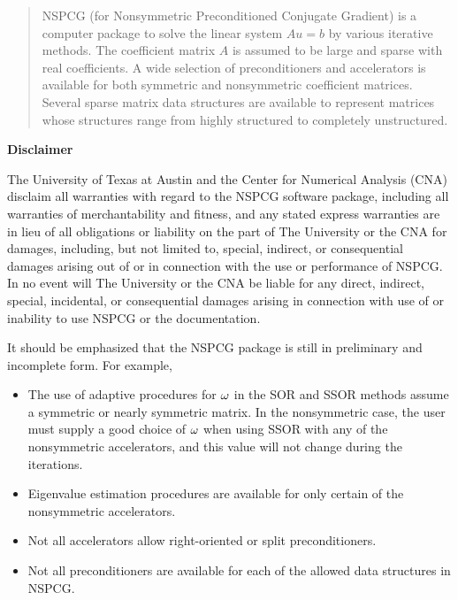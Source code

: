 \date{April, 1988}
\maketitle
\begin{abstract}

   NSPCG (for Nonsymmetric Preconditioned Conjugate Gradient) is
a computer package to solve the linear system $Au=b$ by various
iterative methods.  The coefficient matrix $A$ is assumed to be large and
sparse with real coefficients.  A wide selection of preconditioners 
and accelerators is available for both symmetric and nonsymmetric 
coefficient matrices.  Several sparse matrix data structures are
available to represent matrices whose structures range from highly
structured to completely unstructured.
\end{abstract}
\newpage
\centerline{\bf Disclaimer}
\bigskip

   The University of Texas at Austin and the Center for Numerical 
Analysis (CNA) disclaim all warranties with regard to the NSPCG 
software package, including all warranties of merchantability and 
fitness, and any stated express warranties are in lieu of all 
obligations or liability on the part of The University or the CNA 
for damages, including, but not limited to, special, indirect, or 
consequential damages arising out of or in connection with the 
use or performance of NSPCG.  In no event will The University or 
the CNA be liable for any direct, indirect, special, incidental, or 
consequential damages arising in connection with use of or 
inability to use NSPCG or the documentation.

   It should be emphasized that the NSPCG package is still in preliminary
and incomplete form.  For example, 
\begin{itemize}
 \item The use of adaptive procedures for $\omega$ in the SOR and SSOR 
       methods assume a symmetric or nearly symmetric matrix.  In 
       the nonsymmetric case, the user must supply a good choice of 
       $\omega$ when using SSOR with any of the nonsymmetric accelerators, 
       and this value will not change during the iterations.  
   
 \item Eigenvalue estimation procedures are available for only certain 
       of the nonsymmetric accelerators.

 \item Not all accelerators allow right-oriented or split preconditioners.

 \item Not all preconditioners are available for each of the allowed data 
       structures in NSPCG.
\end{itemize}


